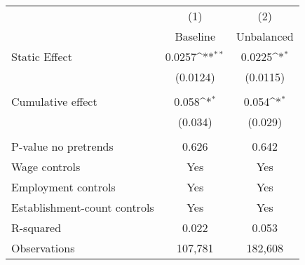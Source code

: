 {
\def\sym#1{\ifmmode^{#1}\else\(^{#1}\)\fi}
\begin{tabular}{l*{2}{c}}
\hline\hline
          &\multicolumn{1}{c}{(1)}&\multicolumn{1}{c}{(2)}\\
          &\multicolumn{1}{c}{Baseline}&\multicolumn{1}{c}{Unbalanced}\\
\hline
Static Effect&   0.0257\sym{**} &   0.0225\sym{*}  \\
          & (0.0124)         & (0.0115)         \\
\hline
\vspace{-1mm}&                  &                  \\
Cumulative effect&0.058\sym{*}         &0.054\sym{*}         \\
          &  (0.034)         &  (0.029)         \\
\hline    &                  &                  \\
P-value no pretrends&    0.626         &    0.642         \\
Wage controls&      Yes         &      Yes         \\
Employment controls&      Yes         &      Yes         \\
Establishment-count controls&      Yes         &      Yes         \\
R-squared &    0.022         &    0.053         \\
Observations&  107,781         &  182,608         \\
\hline\hline
\end{tabular}
}
